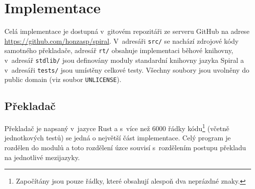 \chapter{Implementace}

Celá implementace je dostupná v~gitovém repozitáři ze serveru GitHub na adrese
\url{https://github.com/honzasp/spiral}. V~adresáři \texttt{src/} se nachází
zdrojové kódy samotného překladače, adresář \texttt{rt/} obsahuje implementaci
běhové knihovny, v~adresář \texttt{stdlib/} jsou definovány moduly standardní
knihovny jazyka Spiral a v~adresáři \texttt{tests/} jsou umístěny celkové testy.
Všechny soubory jsou uvolněny do public domain (viz soubor \texttt{UNLICENSE}).

\section{Překladač}

Překladač je napsaný v~jazyce Rust \cite{rust} a s~více než 6000 řádky
kódu\footnote{Započítány jsou pouze řádky, které obsahují alespoň dva neprázdné
znaky.} (včetně jednotkových testů) se jedná o největší část implementace. Celý
program je rozdělen do modulů a toto rozdělení úzce souvisí s~rozdělením postupu
překladu na jednotlivé mezijazyky.

